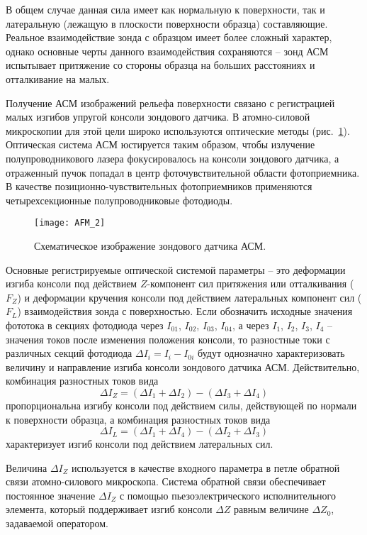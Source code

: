 В общем случае данная сила имеет как нормальную к поверхности, так и латеральную (лежащую в плоскости поверхности образца) составляющие. Реальное взаимодействие зонда с образцом имеет более сложный характер, однако основные черты данного взаимодействия сохраняются -- зонд АСМ испытывает притяжение со стороны образца на больших расстояниях и отталкивание на малых.

Получение АСМ изображений рельефа поверхности связано с регистрацией малых изгибов упругой консоли зондового датчика. В атомно-силовой микроскопии для этой цели широко используются оптические методы (рис.~\ref{fig:AFM_2}). Оптическая система АСМ юстируется таким образом, чтобы излучение полупроводникового лазера фокусировалось на консоли зондового датчика, а отраженный пучок попадал в центр фоточувствительной области фотоприемника. В качестве позиционно-чувствительных фотоприемников применяются четырехсекционные полупроводниковые фотодиоды.

\begin{figure}
	\centering
	\texttt{[image: AFM\_2]}
	\caption{Схематическое изображение зондового датчика АСМ.}
	\label{fig:AFM_2}
\end{figure}

Основные регистрируемые оптической системой параметры -- это деформации изгиба консоли под действием $Z$-компонент сил притяжения или отталкивания ($F_Z$) и деформации кручения консоли под действием латеральных компонент сил ($F_L$) взаимодействия зонда с поверхностью. Если обозначить исходные значения фототока в секциях фотодиода через $I_{01}$, $I_{02}$, $I_{03}$, $I_{04}$, а через $I_{1}$, $I_{2}$, $I_{3}$, $I_{4}$ -- значения токов после изменения положения консоли, то разностные токи с различных секций фотодиода $\Delta I_i = I_i - I_{0i}$ будут однозначно характеризовать величину и направление изгиба консоли зондового датчика АСМ. Действительно, комбинация разностных токов вида
\begin{equation}
	\Delta I_Z = \left(\Delta I_1+\Delta I_2\right)-\left(\Delta I_3+\Delta I_4\right)
\end{equation}
пропорциональна изгибу консоли под действием силы, действующей по нормали к поверхности образца, а комбинация разностных токов вида
\begin{equation}
	\Delta I_L=\left(\Delta I_1+\Delta I_4\right)-\left(\Delta I_2+\Delta I_3\right)
\end{equation}
характеризует изгиб консоли под действием латеральных сил.

Величина $\Delta I_Z$ используется в качестве входного параметра в петле обратной связи атомно-силового микроскопа. Система обратной связи обеспечивает постоянное значение $\Delta I_Z$ с помощью пьезоэлектрического исполнительного элемента, который поддерживает изгиб консоли $\Delta Z$ равным величине $\Delta Z_0$, задаваемой оператором.

